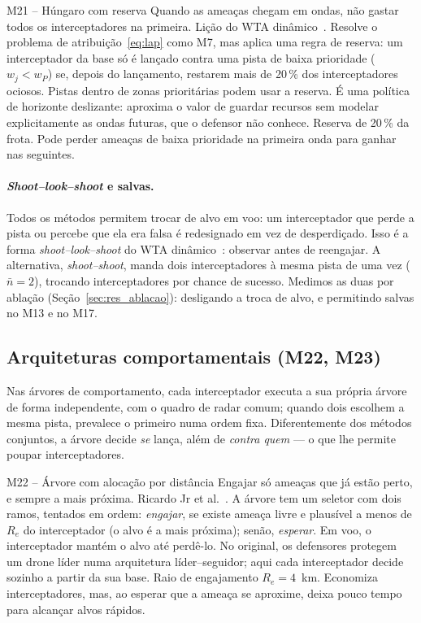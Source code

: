 \begin{metodo}{M21 -- Húngaro com reserva}
\ideia Quando as ameaças chegam em ondas, não gastar todos os interceptadores na primeira.
\orig Lição do WTA dinâmico~\cite{hosein1990}.
\func Resolve o problema de atribuição~\eqref{eq:lap} como M7, mas aplica uma regra de reserva: um interceptador da base só
é lançado contra uma pista de baixa prioridade ($w_j<w_P$) se, depois do lançamento, restarem mais de 20\,\% dos
interceptadores ociosos. Pistas dentro de zonas prioritárias podem usar a reserva.
\adap É uma política de horizonte deslizante: aproxima o valor de guardar recursos sem modelar explicitamente as ondas
futuras, que o defensor não conhece.
\parm Reserva de 20\,\% da frota.
\espera Pode perder ameaças de baixa prioridade na primeira onda para ganhar nas seguintes.
\end{metodo}

\paragraph{\emph{Shoot--look--shoot} e salvas.} Todos os métodos permitem trocar de alvo em voo: um interceptador que perde
a pista ou percebe que ela era falsa é redesignado em vez de desperdiçado. Isso é a forma \emph{shoot--look--shoot} do WTA
dinâmico~\cite{hosein1990}: observar antes de reengajar. A alternativa, \emph{shoot--shoot}, manda dois interceptadores à
mesma pista de uma vez ($\bar n=2$), trocando interceptadores por chance de sucesso. Medimos as duas por ablação
(Seção~\ref{sec:res_ablacao}): desligando a troca de alvo, e permitindo salvas no M13 e no M17.

\subsection{Arquiteturas comportamentais (M22, M23)}
Nas árvores de comportamento, cada interceptador executa a sua própria árvore de forma independente, com o quadro de radar
comum; quando dois escolhem a mesma pista, prevalece o primeiro numa ordem fixa. Diferentemente dos métodos conjuntos, a
árvore decide \emph{se} lança, além de \emph{contra quem} --- o que lhe permite poupar interceptadores.

\begin{metodo}{M22 -- Árvore com alocação por distância}
\ideia Engajar só ameaças que já estão perto, e sempre a mais próxima.
\orig Ricardo Jr et al.~\cite{ricardo2023}.
\func A árvore tem um seletor com dois ramos, tentados em ordem: \emph{engajar}, se existe ameaça livre e plausível a menos
de $R_e$ do interceptador (o alvo é a mais próxima); senão, \emph{esperar}. Em voo, o interceptador mantém o alvo até
perdê-lo.
\adap No original, os defensores protegem um drone líder numa arquitetura líder--seguidor; aqui cada interceptador decide
sozinho a partir da sua base.
\parm Raio de engajamento $R_e=4$~km.
\espera Economiza interceptadores, mas, ao esperar que a ameaça se aproxime, deixa pouco tempo para alcançar alvos rápidos.
\end{metodo}

